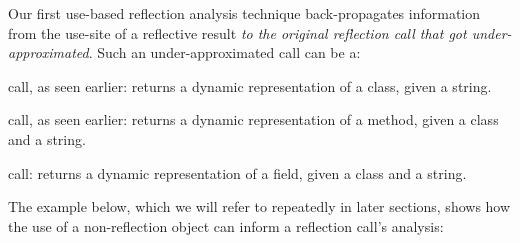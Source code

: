 Our first use-based reflection analysis technique back-propagates
information from the use-site of a reflective result \emph{to the
  original reflection call that got under-approximated}. Such an
under-approximated call can be a:
\begin{compactitem}[--]
\item {} call, as seen earlier: returns a
  dynamic representation of a class, given a string.
\item {} call, as seen
  earlier: returns a dynamic representation of a method, given a class
  and a string.
\item {} call: returns a
  dynamic representation of a field, given a class and a string.
\end{compactitem}

The example below, which we will refer to repeatedly in later
sections, shows how the use of a non-reflection object can inform a
reflection call's analysis:

